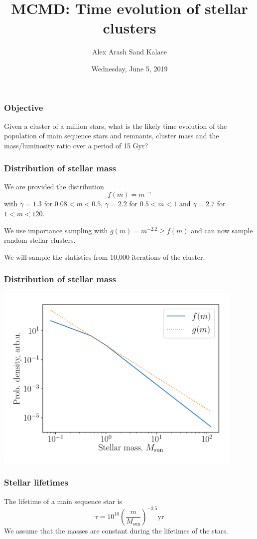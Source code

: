 \documentclass{beamer}
\title{MCMD: Time evolution of stellar clusters}
\author{Alex Arash Sand Kalaee}
\institute{Division of Mathematical Physics, Lund University}
\date{Wednesday, June 5, 2019}
\begin{document}
\maketitle

\begin{frame}
\frametitle{Objective}
Given a cluster of a million stars, what is the likely time evolution of the
population of main sequence stars and remnants, cluster mass
and the mass/luminosity ratio over a period of 15 Gyr?
\end{frame}

\begin{frame}
\frametitle{Distribution of stellar mass}
We are provided the distribution
\begin{equation*}
f(m) = m^{-\gamma}
\end{equation*}
with $\gamma = 1.3$ for $0.08 < m < 0.5$, $\gamma=2.2$ for $0.5 < m < 1$ and
$\gamma = 2.7$ for $1 < m < 120$.

We use importance sampling with $g(m) = m^{-2.2} \geq f(m)$ and can now
sample random stellar clusters.

We will sample the statistics from 10,000 iterations of the cluster.
\end{frame}
\begin{frame}
\frametitle{Distribution of stellar mass}
\begin{center}
\includegraphics[width=0.9\textwidth]{dist.pdf}
\end{center}
\end{frame}

\begin{frame}
\frametitle{Stellar lifetimes}
The lifetime of a main sequence star is
\begin{equation*}
\tau = 10^{10}\left(\frac{m}{M_\mathrm{sun}}\right)^{-2.5}\mathrm{ yr}
\end{equation*}
We assume that the masses are constant during the lifetimes of the stars.
\end{frame}
\end{document}
